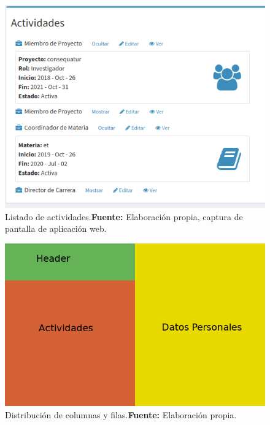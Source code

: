 
\begin{figure}[h]
    \includegraphics[width=1\linewidth]{image/vista_persona.png}
    \caption{Listado de actividades.\newline \textbf{Fuente:} Elaboración propia, captura de pantalla de aplicación web.}
    \label{fig:image/vista_persona}
\end{figure}


\begin{figure}[h]
    \includegraphics[width=1\linewidth]{image/grid.png}
    \caption{Distribución de columnas y filas.\newline \textbf{Fuente:} Elaboración propia.}
    \label{fig:image/grid}
\end{figure}
